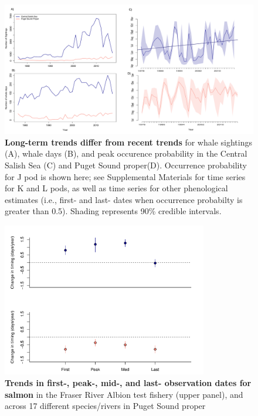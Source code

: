 \documentclass{article}
\begin{document}
\begin{figure}[p]
\includegraphics{../analyses/figures/OrcaPhenPlots/timeseries_1976_assumeSRKW2regs.pdf} 
\caption{\textbf{Long-term trends differ from recent trends} for whale sightings (A), whale days (B), and peak occurence probability in the Central Salish Sea (C) and Puget Sound proper(D). Occurrence probability for J pod is shown here; see Supplemental Materials for time series for K and L pods, as well as time series for other phenological estimates (i.e., first- and last- dates when occurrence probabilty is greater than 0.5). Shading represents 90\% credible intervals.}
 \label{fig:timeseries}
 \end{figure}
 

\begin{figure}[p]
\includegraphics[width=0.8\textwidth]{../analyses/figures/salmon_shifts_lmm.pdf} 
\caption{\textbf{Trends in first-, peak-, mid-, and last- observation dates for salmon} in the Fraser River Albion test fishery (upper panel), and across 17 different species/rivers in Puget Sound proper}
 \label{fig:shifts}
 \end{figure}
\end{document}
